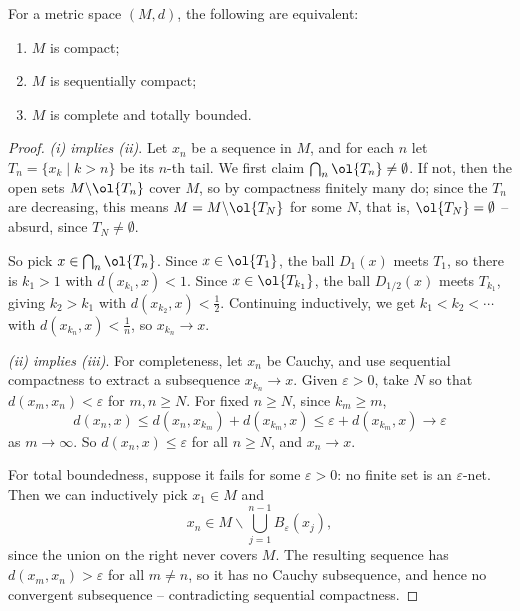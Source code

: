 \begin{theorem}\label{thm:bigequiv}
    For a metric space $(M, d)$, the following are equivalent:
    \begin{enumerate}[label=(\roman*)]
        \item $M$ is compact;
        \item $M$ is sequentially compact;
        \item $M$ is complete and totally bounded.
    \end{enumerate}
\end{theorem}
\begin{proof}
    \emph{(i) implies (ii)}. Let $x_n$ be a sequence in $M$, and for each $n$ let $T_n = \{x_k \mid k > n\}$ be its $n$-th tail. We first claim $\bigcap_{n} \ol{T_n} \neq \emptyset$. If not, then the open sets $M \backslash \ol{T_n}$ cover $M$, so by compactness finitely many do; since the $T_n$ are decreasing, this means $M = M \backslash \ol{T_N}$ for some $N$, that is, $\ol{T_N} = \emptyset$ -- absurd, since $T_N \neq \emptyset$.

    So pick $x \in \bigcap_n \ol{T_n}$. Since $x \in \ol{T_1}$, the ball $D_1(x)$ meets $T_1$, so there is $k_1 > 1$ with $d(x_{k_1}, x) < 1$. Since $x \in \ol{T_{k_1}}$, the ball $D_{1/2}(x)$ meets $T_{k_1}$, giving $k_2 > k_1$ with $d(x_{k_2}, x) < \frac{1}{2}$. Continuing inductively, we get $k_1 < k_2 < \cdots$ with $d(x_{k_n}, x) < \frac{1}{n}$, so $x_{k_n} \rightarrow x$.

    \emph{(ii) implies (iii)}. For completeness, let $x_n$ be Cauchy, and use sequential compactness to extract a subsequence $x_{k_n} \rightarrow x$. Given $\varepsilon > 0$, take $N$ so that $d(x_m, x_n) < \varepsilon$ for $m, n \geq N$. For fixed $n \geq N$, since $k_m \geq m$,
    $$
    d(x_n, x) \leq d(x_n, x_{k_m}) + d(x_{k_m}, x) \leq \varepsilon + d(x_{k_m}, x) \rightarrow \varepsilon
    $$
    as $m \rightarrow \infty$. So $d(x_n, x) \leq \varepsilon$ for all $n \geq N$, and $x_n \rightarrow x$.

    For total boundedness, suppose it fails for some $\varepsilon > 0$: no finite set is an $\varepsilon$-net. Then we can inductively pick $x_1 \in M$ and
    $$
    x_n \in M \backslash \bigcup_{j = 1}^{n - 1} B_{\varepsilon}(x_j),
    $$
    since the union on the right never covers $M$. The resulting sequence has $d(x_m, x_n) > \varepsilon$ for all $m \neq n$, so it has no Cauchy subsequence, and hence no convergent subsequence -- contradicting sequential compactness.


\end{proof}
